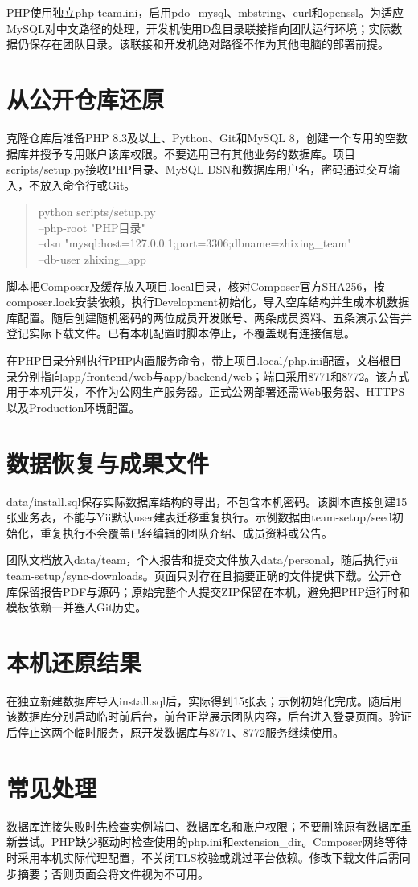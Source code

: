 \documentclass[UTF8,a4paper,11pt,fontset=windows]{ctexart}
\begin{document}
PHP使用独立php-team.ini，启用pdo\_mysql、mbstring、curl和openssl。为适应MySQL对中文路径的处理，开发机使用D盘目录联接指向团队运行环境；实际数据仍保存在团队目录。该联接和开发机绝对路径不作为其他电脑的部署前提。

\section{从公开仓库还原}
克隆仓库后准备PHP 8.3及以上、Python、Git和MySQL 8，创建一个专用的空数据库并授予专用账户该库权限。不要选用已有其他业务的数据库。项目scripts/setup.py接收PHP目录、MySQL DSN和数据库用户名，密码通过交互输入，不放入命令行或Git。

\begin{quote}\ttfamily\small
python scripts/setup.py\\
--php-root "PHP目录"\\
--dsn "mysql:host=127.0.0.1;port=3306;dbname=zhixing\_team"\\
--db-user zhixing\_app
\end{quote}

脚本把Composer及缓存放入项目.local目录，核对Composer官方SHA256，按composer.lock安装依赖，执行Development初始化，导入空库结构并生成本机数据库配置。随后创建随机密码的两位成员开发账号、两条成员资料、五条演示公告并登记实际下载文件。已有本机配置时脚本停止，不覆盖现有连接信息。

在PHP目录分别执行PHP内置服务命令，带上项目.local/php.ini配置，文档根目录分别指向app/frontend/web与app/backend/web；端口采用8771和8772。该方式用于本机开发，不作为公网生产服务器。正式公网部署还需Web服务器、HTTPS以及Production环境配置。

\section{数据恢复与成果文件}
data/install.sql保存实际数据库结构的导出，不包含本机密码。该脚本直接创建15张业务表，不能与Yii默认user建表迁移重复执行。示例数据由team-setup/seed初始化，重复执行不会覆盖已经编辑的团队介绍、成员资料或公告。

团队文档放入data/team，个人报告和提交文件放入data/personal，随后执行yii team-setup/sync-downloads。页面只对存在且摘要正确的文件提供下载。公开仓库保留报告PDF与源码；原始完整个人提交ZIP保留在本机，避免把PHP运行时和模板依赖一并塞入Git历史。

\section{本机还原结果}
在独立新建数据库导入install.sql后，实际得到15张表；示例初始化完成。随后用该数据库分别启动临时前后台，前台正常展示团队内容，后台进入登录页面。验证后停止这两个临时服务，原开发数据库与8771、8772服务继续使用。

\section{常见处理}
数据库连接失败时先检查实例端口、数据库名和账户权限；不要删除原有数据库重新尝试。PHP缺少驱动时检查使用的php.ini和extension\_dir。Composer网络等待时采用本机实际代理配置，不关闭TLS校验或跳过平台依赖。修改下载文件后需同步摘要；否则页面会将文件视为不可用。
\end{document}
